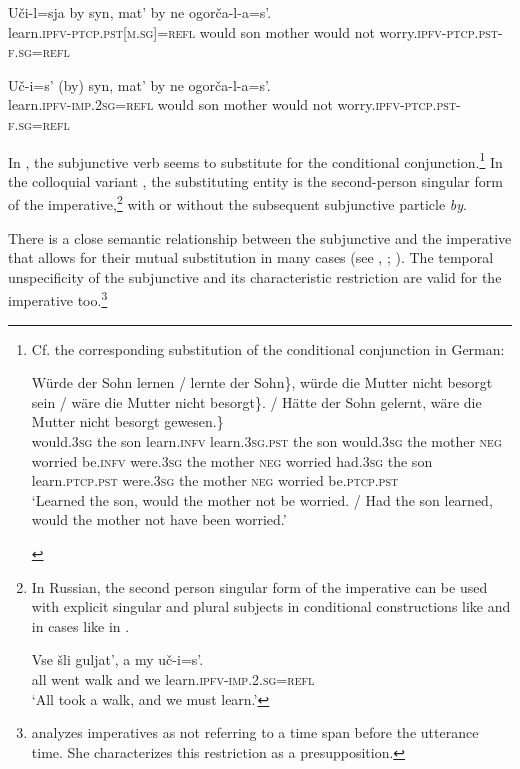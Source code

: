 \documentclass[output=paper,colorlinks,citecolor=brown]{langscibook}
\begin{document}
\begin{otherlanguage}{english}
\ea\label{ex:16:28}
\gll Uči-l=sja by syn, mat' by ne ogorča-l-a=s'. \\
 learn.\textsc{ipfv}-\textsc{ptcp.pst}[\textsc{m.sg}]=\textsc{refl} would son mother would not worry.\textsc{ipfv}-\textsc{ptcp.pst}-\textsc{f.sg}=\textsc{refl}  \\
\z

\ea\label{ex:16:29}
\gll Uč-i=s' (by) syn, mat' by ne ogorča-l-a=s'. \\
 learn.\textsc{ipfv}-\textsc{imp.2sg}=\textsc{refl} would son mother would not worry.\textsc{ipfv}-\textsc{ptcp.pst}-\textsc{f.sg}=\textsc{refl} \\
\z

\noindent In , the subjunctive verb seems to substitute for the conditional conjunction.\footnote{Cf. the corresponding substitution of the conditional conjunction in German:

\begin{exe}
\ex 
\gll \minsp{\{\{} Würde der Sohn lernen / lernte der Sohn\}, \minsp{\{} würde die Mutter nicht besorgt sein / wäre die Mutter nicht besorgt\}. / Hätte der Sohn gelernt, wäre die Mutter nicht besorgt gewesen.\} \\
{} would.3\textsc{sg} the son learn.\textsc{infv} {} learn.3\textsc{sg}.\textsc{pst} the son {} would.3\textsc{sg} the mother \textsc{neg} worried be.\textsc{infv} {} were.3\textsc{sg} the mother \textsc{neg} worried {} had.3\textsc{sg} the son learn.\textsc{ptcp.pst} were.3\textsc{sg} the mother \textsc{neg} worried be.\textsc{ptcp.pst}    \\
\glt ‘Learned the son, would the mother not be worried. / Had the son learned, would the mother not have been worried.’
\end{exe}

} In the colloquial variant , the substituting entity is the second-person singular form of the imperative,\footnote{In Russian, the second person singular form of the imperative can be used with explicit singular and plural subjects in conditional constructions like  and in cases like in .

\ea\label{ex:16:infn33}
\gll Vse šli guljat', a my uč-i=s'.  \\
  all went walk and we learn.\textsc{ipfv}-\textsc{imp.2.sg}=\textsc{refl} \\
\glt `All took a walk, and we must learn.'
\z
} with or without the subsequent subjunctive particle \textit{by}.

There is a close semantic relationship between the subjunctive and the imperative that allows for their mutual substitution in many cases (see \citeauthor{Zimmermann2009} \citeyear{Zimmermann2009}, \citeyear{Zimmermann2017}; \citealt{Dvorak-Zimmermann2007}). The temporal unspecificity of the subjunctive and its characteristic restriction are valid for the imperative too.\footnote{\textcite{Kaufmann2012} analyzes imperatives as not referring to a time span before the utterance time. She characterizes this restriction as a presupposition.
}



\end{otherlanguage}
\end{document}

